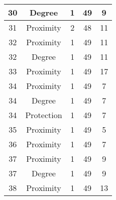 \documentclass[results.tex]{subfiles}
\begin{document}
\begin{center}
\begin{tabular}{| c || c | c | c | c |}
            \hline
            30                      & Degree                       & 1                      & 49                      & 9                    \\
            \hline
            31                      & Proximity                    & 2                      & 48                      & 11                   \\
            \hline
            32                      & Proximity                    & 1                      & 49                      & 11                   \\
            \hline
            32                      & Degree                       & 1                      & 49                      & 11                   \\
            \hline
            33                      & Proximity                    & 1                      & 49                      & 17                   \\
            \hline
            34                      & Proximity                    & 1                      & 49                      & 7                    \\
            \hline
            34                      & Degree                       & 1                      & 49                      & 7                    \\
            \hline
            34                      & Protection                   & 1                      & 49                      & 7                    \\
            \hline
            35                      & Proximity                    & 1                      & 49                      & 5                    \\
            \hline
            36                      & Proximity                    & 1                      & 49                      & 7                    \\
            \hline
            37                      & Proximity                    & 1                      & 49                      & 9                    \\
            \hline
            37                      & Degree                       & 1                      & 49                      & 9                    \\
            \hline
            38                      & Proximity                    & 1                      & 49                      & 13                   \\

\end{tabular}
\end{center}
\end{document}
